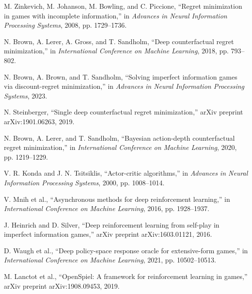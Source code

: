 \documentclass[11pt]{article}
\begin{document}

\begin{thebibliography}{99}

M. Zinkevich, M. Johanson, M. Bowling, and C. Piccione, ``Regret minimization in games with incomplete information,'' in \emph{Advances in Neural Information Processing Systems}, 2008, pp. 1729--1736.

N. Brown, A. Lerer, A. Gross, and T. Sandholm, ``Deep counterfactual regret minimization,'' in \emph{International Conference on Machine Learning}, 2018, pp. 793--802.

N. Brown, A. Brown, and T. Sandholm, ``Solving imperfect information games via discount-regret minimization,'' in \emph{Advances in Neural Information Processing Systems}, 2023.

N. Steinberger, ``Single deep counterfactual regret minimization,'' arXiv preprint arXiv:1901.06263, 2019.

N. Brown, A. Lerer, and T. Sandholm, ``Bayesian action-depth counterfactual regret minimization,'' in \emph{International Conference on Machine Learning}, 2020, pp. 1219--1229.

V. R. Konda and J. N. Tsitsiklis, ``Actor-critic algorithms,'' in \emph{Advances in Neural Information Processing Systems}, 2000, pp. 1008--1014.

V. Mnih et al., ``Asynchronous methods for deep reinforcement learning,'' in \emph{International Conference on Machine Learning}, 2016, pp. 1928--1937.

J. Heinrich and D. Silver, ``Deep reinforcement learning from self-play in imperfect information games,'' arXiv preprint arXiv:1603.01121, 2016.

D. Waugh et al., ``Deep policy-space response oracle for extensive-form games,'' in \emph{International Conference on Machine Learning}, 2021, pp. 10502--10513.

M. Lanctot et al., ``OpenSpiel: A framework for reinforcement learning in games,'' arXiv preprint arXiv:1908.09453, 2019.

\end{thebibliography}
\end{document}
